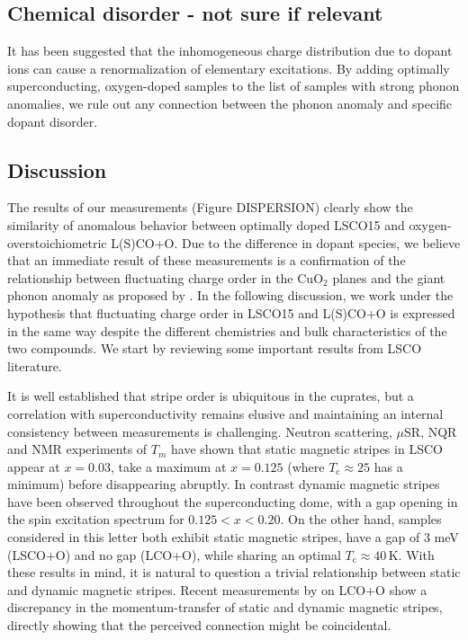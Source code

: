 \subsection{Chemical disorder - not sure if relevant}
It has been suggested that the inhomogeneous charge distribution due to dopant ions can cause a renormalization of elementary excitations\cite{Park2011}. By adding optimally superconducting, oxygen-doped samples to the list of samples with strong phonon anomalies, we rule out any connection between the phonon anomaly and specific dopant disorder.

\subsection{Discussion}
The results of our measurements (Figure DISPERSION) clearly show the similarity of anomalous behavior between optimally doped LSCO15 and oxygen-overstoichiometric L(S)CO+O. Due to the difference in dopant species, we believe that an immediate result of these measurements is a confirmation of the relationship between fluctuating charge order in the CuO$_2$ planes and the giant phonon anomaly as proposed by \citeauthor{Reznik2012}\cite{Reznik2012}. In the following discussion, we work under the hypothesis that fluctuating charge order in LSCO15 and L(S)CO+O is expressed in the same way despite the different chemistries and bulk characteristics of the two compounds. We start by reviewing some important results from LSCO literature.

It is well established that stripe order is ubiquitous in the cuprates, but a correlation with superconductivity remains elusive and maintaining an internal consistency between measurements is challenging. Neutron scattering, $\mu$SR, NQR and NMR experiments of $T_m$ have shown that static magnetic stripes in LSCO appear at $x=0.03$, take a maximum at $x=0.125$ (where $T_\text{c} \approx 25$ has a minimum) before disappearing abruptly\cite{Julien2003, Hirota2001}. In contrast dynamic magnetic stripes have been observed throughout the superconducting dome, with a gap opening in the spin excitation spectrum for $0.125 < x < 0.20$\cite{Kofu2009, Lee2000, Gilardi2004}. On the other hand, samples considered in this letter both exhibit static magnetic stripes, have a gap of 3 meV (LSCO+O) and no gap (LCO+O)\cite{Wells1997, Jacobsen2018}, while sharing an optimal $T_\text{c} \approx 40\,\text{K}$. With these results in mind, it is natural to question a trivial relationship between static and dynamic magnetic stripes. Recent measurements by \citeauthor{Jacobsen2018} on LCO+O show a discrepancy in the momentum-transfer of static and dynamic magnetic stripes\cite{Jacobsen2018}, directly showing that the perceived connection might be coincidental.

